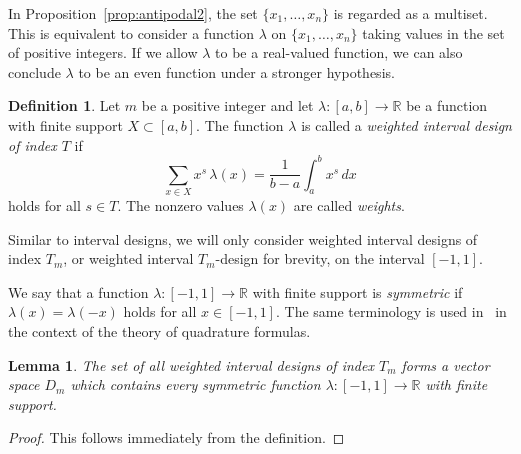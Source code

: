 \documentclass[11pt]{amsart}
\newtheorem{lem}[thm]{Lemma}
\theoremstyle{definition}
\newtheorem{dfn}[thm]{Definition}
\newcommand{\R}{\mathbb{R}}
\newcommand{\iantipodal}{symmetric}
\begin{document}
In Proposition~\ref{prop:antipodal2}, the set 
$\{x_1,\dots,x_{n}\}$ is regarded as a multiset.
This is equivalent to consider a function $\lambda$ on
$\{x_1,\dots,x_{n}\}$ taking values in the set of positive integers.
If we allow $\lambda$ to be a real-valued function, we can also conclude
$\lambda$ to be an even function under a stronger hypothesis.

\begin{dfn}\label{def:w-intt-design}
Let \( m \) be a positive integer and let \( \lambda \colon[a,b]\to\R \) be a function with finite support \( X\subset[a,b] \). The function \( \lambda \) is called a \emph{weighted interval design of index \( T \)} if
\begin{equation}\label{w_interval_design}
\sum_{x\in X} x^s\,\lambda(x)=\frac{1}{b-a}\int_a^b x^s\,dx
\end{equation}
holds for all \( s\in T \). The nonzero values \( \lambda(x) \) are called \emph{weights}.
\end{dfn}

Similar to interval designs, we will only
consider weighted interval designs of index $T_m$, or
weighted interval $T_m$-design for brevity, on the interval $[-1,1]$.

We say that a function $\lambda : [-1,1] \to \R$ with finite support  is 
\emph{\iantipodal} if $\lambda(x)=\lambda(-x)$ holds for all $x\in[-1,1]$.
The same terminology is used in~\cite[Section~6]{MR1240246} in the context of the theory of quadrature formulas.

\begin{lem}\label{lem: vec}
The set of all weighted interval designs of index $T_m$ forms a vector space $D_m$ which contains every symmetric function $\lambda : [-1,1] \to \R$ with finite support.
\end{lem}

\begin{proof}
This follows immediately from the definition.
\end{proof}
\end{document}
